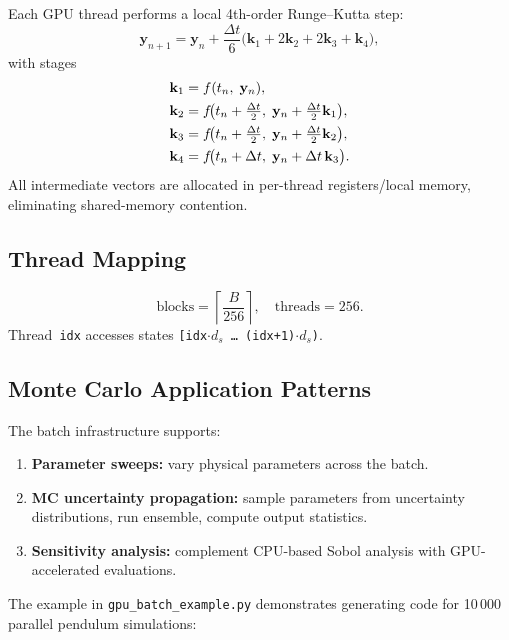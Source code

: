 \documentclass[11pt,letterpaper,twocolumn]{article}
\newcommand{\code}[1]{\texttt{#1}}
\theoremstyle{definition}
\begin{document}
Each GPU thread performs a local 4th-order Runge--Kutta step:
\begin{equation}\label{eq:rk4}
  \mathbf{y}_{n+1} = \mathbf{y}_n + \frac{\Delta t}{6}\big(\mathbf{k}_1 + 2\mathbf{k}_2 + 2\mathbf{k}_3 + \mathbf{k}_4\big),
\end{equation}
with stages
\begin{align}
  \mathbf{k}_1 &= f(t_n,\;\mathbf{y}_n), \notag\\
  \mathbf{k}_2 &= f\!\big(t_n+\tfrac{\Delta t}{2},\;\mathbf{y}_n+\tfrac{\Delta t}{2}\mathbf{k}_1\big), \notag\\
  \mathbf{k}_3 &= f\!\big(t_n+\tfrac{\Delta t}{2},\;\mathbf{y}_n+\tfrac{\Delta t}{2}\mathbf{k}_2\big), \notag\\
  \mathbf{k}_4 &= f\!\big(t_n+\Delta t,\;\mathbf{y}_n+\Delta t\,\mathbf{k}_3\big). \label{eq:rk4-stages}
\end{align}
All intermediate vectors are allocated in per-thread registers/local memory, eliminating shared-memory contention.

\subsection{Thread Mapping}

\begin{equation}
  \text{blocks} = \left\lceil \frac{B}{256} \right\rceil, \quad
  \text{threads} = 256.
\end{equation}
Thread~\code{idx} accesses states \code{[idx$\cdot d_s$ \ldots\ (idx+1)$\cdot d_s$)}.

\subsection{Monte Carlo Application Patterns}

The batch infrastructure supports:
\begin{enumerate}
  \item \textbf{Parameter sweeps:} vary physical parameters across the batch.
  \item \textbf{MC uncertainty propagation:} sample parameters from uncertainty distributions, run ensemble, compute output statistics.
  \item \textbf{Sensitivity analysis:} complement CPU-based Sobol analysis with GPU-accelerated evaluations.
\end{enumerate}

\noindent
The example in \code{gpu\_batch\_example.py} demonstrates generating code for 10\,000 parallel pendulum simulations:
\end{document}
